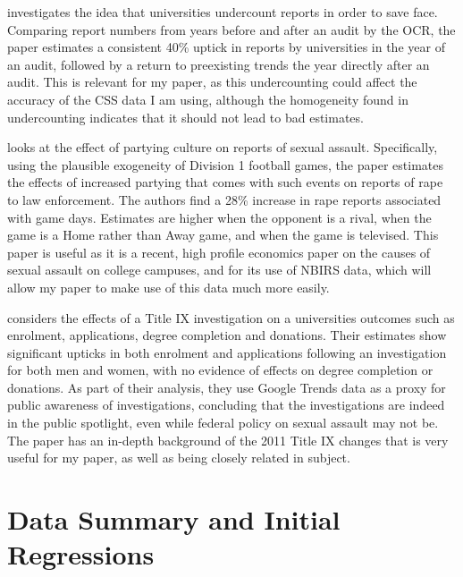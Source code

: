 \documentclass[AER,draftmode]{AEA}
\begin{document}
 investigates the idea that universities undercount reports in order to save face.  Comparing report numbers from years before and after an audit by the OCR, the paper estimates a consistent 40\% uptick in reports by universities in the year of an audit, followed by a return to preexisting trends the year directly after an audit. This is relevant for my paper, as this undercounting could affect the accuracy of the CSS data I am using, although the homogeneity found in undercounting indicates that it should not lead to bad estimates.

 looks at the effect of partying culture on reports of sexual assault. Specifically, using the plausible exogeneity of Division 1 football games, the paper estimates the effects of increased partying that comes with such events on reports of rape to law enforcement. The authors find a 28\% increase in rape reports associated with game days. Estimates are higher when the opponent is a rival, when the game is a Home rather than Away game, and when the game is televised. This paper is useful as it is a recent, high profile economics paper on the causes of sexual assault on college campuses, and for its use of NBIRS data, which will allow my paper to make use of this data much more easily.

 considers the effects of a Title IX investigation on a universities outcomes such as enrolment, applications, degree completion and donations. Their estimates show significant upticks in both enrolment and applications following an investigation for both men and women, with no evidence of effects on degree completion or donations. As part of their analysis, they use Google Trends data as a proxy for public awareness of investigations, concluding that the investigations are indeed in the public spotlight, even while federal policy on sexual assault may not be. The paper has an in-depth background of the 2011 Title IX changes that is very useful for my paper, as well as being closely related in subject. 

\section{Data Summary and Initial Regressions}
\end{document}
